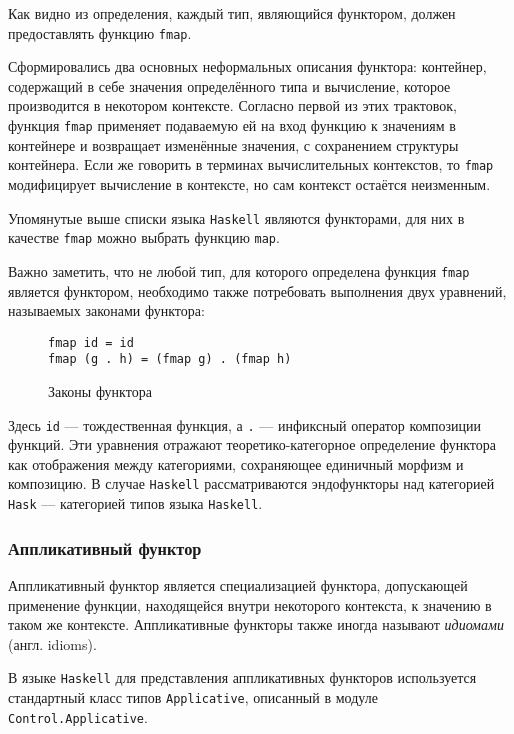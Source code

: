 Как видно из определения, каждый тип, являющийся функтором, должен предоставлять функцию \lstinline{fmap}.

Сформировались два основных неформальных описания функтора: контейнер, содержащий в себе значения определённого типа и вычисление, которое производится в некотором контексте. Согласно первой из этих трактовок, функция \lstinline{fmap} применяет подаваемую ей на вход функцию к значениям в контейнере и возвращает изменённые значения, с сохранением структуры контейнера. Если же говорить в терминах вычислительных контекстов, то \lstinline{fmap} модифицирует вычисление в контексте, но сам контекст остаётся неизменным.

Упомянутые выше списки языка \lstinline{Haskell} являются функторами, для них в качестве \lstinline{fmap} можно выбрать функцию \lstinline{map}.

Важно заметить, что не любой тип, для которого определена функция \lstinline{fmap} является функтором, необходимо также потребовать выполнения двух уравнений, называемых законами функтора:

\begin{figure}[h]
\begin{lstlisting}
fmap id = id
fmap (g . h) = (fmap g) . (fmap h)
\end{lstlisting}
\caption{Законы функтора}
\label{listing:FunctorLaws}
\end{figure}

Здесь \lstinline{id} --- тождественная функция, а \lstinline{.} --- инфиксный оператор композиции функций. Эти уравнения отражают теоретико-категорное определение функтора как отображения между категориями, сохраняющее единичный морфизм и композицию. В случае \lstinline{Haskell} рассматриваются эндофункторы над категорией \lstinline{Hask} --- категорией типов языка \lstinline{Haskell}.

\subsubsection{Аппликативный функтор}

Аппликативный функтор является специализацией функтора, допускающей применение функции, находящейся внутри некоторого контекста, к значению в таком же контексте. Аппликативные функторы также иногда называют \emph{идиомами} (англ. idioms).

В языке \lstinline{Haskell} для представления аппликативных функторов используется стандартный класс типов \lstinline{Applicative}, описанный в модуле \lstinline{Control.Applicative}.

